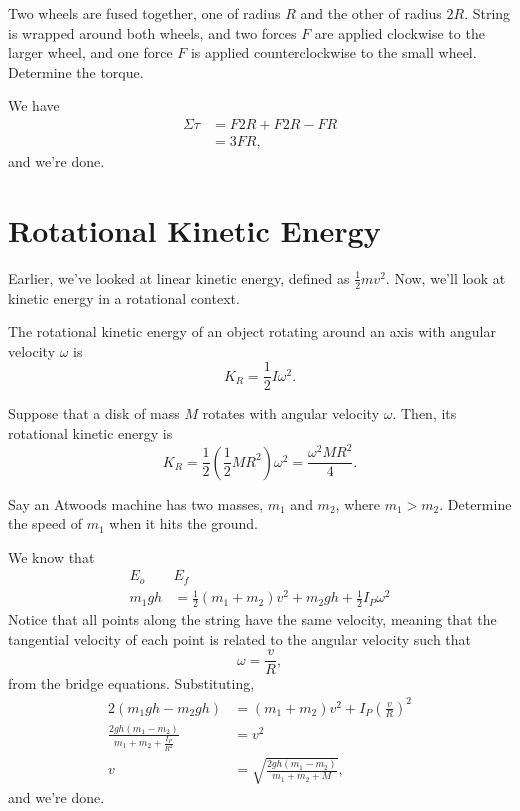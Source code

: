\documentclass[11pt]{article}
\begin{document}
\begin{example}
	Two wheels are fused together, one of radius $R$ and the other of radius $2R$. String is wrapped around both wheels, and two forces $F$ are applied clockwise to the larger wheel, and one force $F$ is applied counterclockwise to the small wheel. Determine the torque.
\end{example}
\begin{solution}
	We have
	\begin{align*}
		\Sigma\tau &= F2R + F2R - FR \\
		&= 3FR,
	\end{align*}
	and we're done.
\end{solution}

\section{Rotational Kinetic Energy}
Earlier, we've looked at linear kinetic energy, defined as $\frac{1}{2}mv^2$. Now, we'll look at kinetic energy in a rotational context.
\begin{defn}
	The rotational kinetic energy of an object rotating around an axis with angular velocity $\omega$ is
	\[K_{R} = \frac{1}{2}I\omega^2.\]
\end{defn}
Suppose that a disk of mass $M$ rotates with angular velocity $\omega$. Then, its rotational kinetic energy is
\[K_R = \frac{1}{2}\left(\frac{1}{2}MR^2\right)\omega^2 = \boxed{\frac{\omega^2MR^2}{4}}.\]
\begin{example}
	Say an Atwoods machine has two masses, $m_1$ and $m_2$, where $m_1>m_2$.  Determine the speed of $m_1$ when it hits the ground.
\end{example}
\begin{solution}
	We know that
	\begin{align*}
		E_o & E_f \\
	m_1gh &= \frac{1}{2}(m_1+m_2)v^2 + m_2gh + \frac{1}{2}I_P\omega^2
	\end{align*}
	Notice that all points along the string have the same velocity, meaning that the tangential velocity of each point is related to the angular velocity such that
	\[\omega = \frac{v}{R},\]
	from the bridge equations. Substituting,
	\begin{align*}
		2(m_1gh - m_2gh) &= (m_1+m_2)v^2 + I_P\left(\frac{v}{R}\right)^2 \\
		\frac{2gh(m_1-m_2)}{m_1+m_2+\frac{I_P}{R^2}} &= v^2 \\
		v &= \boxed{\sqrt{\frac{2gh(m_1-m_2)}{m_1+m_2+M}}},
	\end{align*}
	and we're done.
\end{solution}
\end{document}
